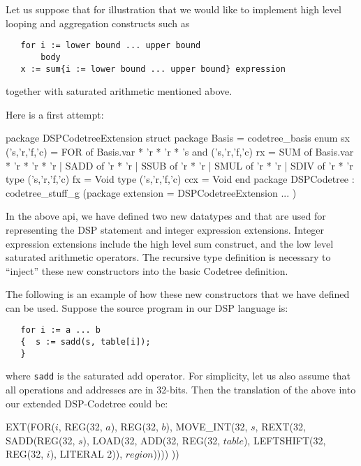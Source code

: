 Let us suppose that for illustration that we would like to
implement high level looping and aggregation constructs such as
\begin{verbatim}
   for i := lower bound ... upper bound
       body
   x := sum{i := lower bound ... upper bound} expression
\end{verbatim}
together with saturated arithmetic mentioned above.

Here is a first attempt:
\begin{SML}
package DSPCodetreeExtension
struct
   package Basis = codetree_basis
   enum sx ('s,'r,'f,'c) = 
      FOR of Basis.var * 'r * 'r * 's
   and ('s,'r,'f,'c) rx = 
      SUM of Basis.var * 'r * 'r * 'r
    | SADD of 'r * 'r
    | SSUB of 'r * 'r
    | SMUL of 'r * 'r
    | SDIV of 'r * 'r
   type ('s,'r,'f,'c) fx = Void
   type ('s,'r,'f,'c) ccx = Void
end
package DSPCodetree : codetree_stuff_g
    (package extension = DSPCodetreeExtension
     ...
    )
\end{SML}
In the above api, we have defined two new datatypes 
and  that are used for representing the DSP statement
and integer expression extensions.  Integer expression extensions
include the high level sum construct, and the low level saturated
arithmetic operators.  The recursive type definition is
necessary to ``inject'' these new constructors into the basic Codetree 
definition.

The following is an example of how these new constructors that we have defined can be used.  Suppose the source program in our DSP language is:
\begin{verbatim}
   for i := a ... b
   {  s := sadd(s, table[i]);
   }
\end{verbatim}
\noindent where \verb|sadd| is the saturated add operator.
For simplicity, let us also assume that all operations and addresses
are in 32-bits.
Then the translation of the above into our extended DSP-Codetree could be:
\begin{SML}
   EXT(FOR(\(i\), REG(32, \(a\)), REG(32, \(b\)),
           MOVE_INT(32, \(s\), REXT(32, SADD(REG(32, \(s\)), 
                LOAD(32, 
                    ADD(32, REG(32, \(table\)), 
                        LEFTSHIFT(32, REG(32, \(i\)), LITERAL 2)),
                         \(region\)))))
          ))
\end{SML}

